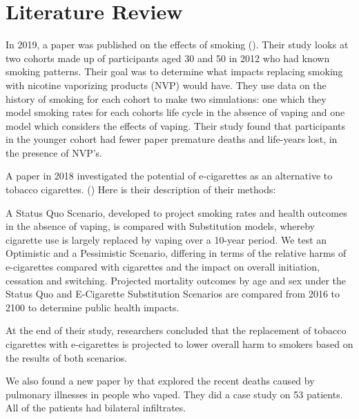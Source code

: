\documentclass[article]{article}
\begin{document}
\section{Literature Review}

In 2019, a paper was published on the effects of smoking (\cite{levy2019modeling}). Their study looks at two cohorts made up of participants aged 30 and 50 in 2012 who had known smoking patterns. Their goal was to determine what impacts replacing smoking with nicotine vaporizing products (NVP) would have. They use data on the history of smoking for each cohort to make two simulations: one which they model smoking rates for each cohorts life cycle in the absence of vaping and one model which considers the effects of vaping. Their study found that participants in the younger cohort had fewer paper premature deaths and life-years lost, in the presence of NVP's.

\medskip

A paper in 2018 investigated the potential of e-cigarettes as an alternative to tobacco cigarettes. (\cite{Levy18})
Here is their description of their methods: 

\begin{displayquote}
A Status Quo Scenario, developed to project smoking rates and health outcomes in the absence of vaping, is compared with Substitution models, whereby cigarette use is largely replaced by vaping over a 10-year period. We test an Optimistic and a Pessimistic Scenario, differing in terms of the relative harms of e-cigarettes compared with cigarettes and the impact on overall initiation, cessation and switching. Projected mortality outcomes by age and sex under the Status Quo and E-Cigarette Substitution Scenarios are compared from 2016 to 2100 to determine public health impacts.
\end{displayquote}

At the end of their study, researchers concluded that the replacement of tobacco cigarettes with e-cigarettes is projected to lower overall harm to smokers based on the results of both scenarios.

\medskip

We also found a new paper by \cite{doi:10.1056/NEJMoa1911614} that explored the recent deaths caused by pulmonary illnesses in people who vaped. They did a case study on 53 patients. All of the patients had bilateral infiltrates.
\end{document}
